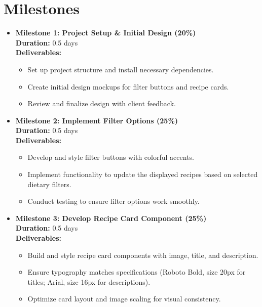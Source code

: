 \documentclass{article}
\begin{document}
\section*{Milestones}

\begin{itemize}
    \item \textbf{Milestone 1: Project Setup \& Initial Design (20\%)} \\ 
    \textbf{Duration:} 0.5 days \\ 
    \textbf{Deliverables:}
    \begin{itemize}
        \item Set up project structure and install necessary dependencies.
        \item Create initial design mockups for filter buttons and recipe cards.
        \item Review and finalize design with client feedback.
    \end{itemize}

    \item \textbf{Milestone 2: Implement Filter Options (25\%)} \\ 
    \textbf{Duration:} 0.5 days \\ 
    \textbf{Deliverables:}
    \begin{itemize}
        \item Develop and style filter buttons with colorful accents.
        \item Implement functionality to update the displayed recipes based on selected dietary filters.
        \item Conduct testing to ensure filter options work smoothly.
    \end{itemize}

    \item \textbf{Milestone 3: Develop Recipe Card Component (25\%)} \\ 
    \textbf{Duration:} 0.5 days \\ 
    \textbf{Deliverables:}
    \begin{itemize}
        \item Build and style recipe card components with image, title, and description.
        \item Ensure typography matches specifications (Roboto Bold, size 20px for titles; Arial, size 16px for descriptions).
        \item Optimize card layout and image scaling for visual consistency.
    \end{itemize}


\end{itemize}
\end{document}
